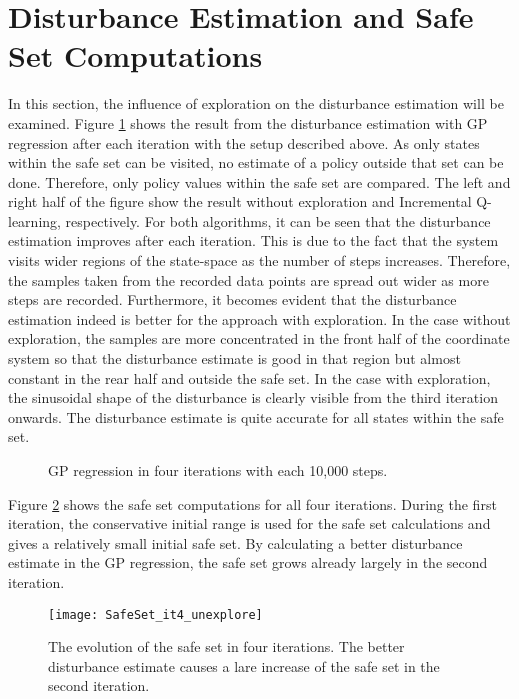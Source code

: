 \documentclass[../main.tex]{subfiles}
\begin{document}
\section{Disturbance Estimation and Safe Set Computations}
In this section, the influence of exploration on the disturbance estimation will be examined. Figure \ref{fig:GP_it4_doubleexplore} shows the result from the disturbance estimation with GP regression after each iteration with the setup described above. As only states within the safe set can be visited, no estimate of a policy outside that set can be done. Therefore, only policy values within the safe set are compared. The left and right half of the figure show the result without exploration and Incremental Q-learning, respectively. For both algorithms, it can be seen that the disturbance estimation improves after each iteration. This is due to the fact that the system visits wider regions of the state-space as the number of steps increases. Therefore, the samples taken from the recorded data points are spread out wider as more steps are recorded. Furthermore, it becomes evident that the disturbance estimation indeed is better for the approach with exploration. In the case without exploration, the samples are more concentrated in the front half of the coordinate system so that the disturbance estimate is good in that region but almost constant in the rear half and outside the safe set. In the case with exploration, the sinusoidal shape of the disturbance is clearly visible from the third iteration onwards. The disturbance estimate is quite accurate for all states within the safe set. 

\begin{figure}[H]
    \centering
        \caption{GP regression in four iterations with each 10,000 steps.}  \label{fig:GP_it4_doubleexplore}
\end{figure}


Figure \ref{fig:SafeSet_it4_unexplore} shows the safe set computations for all four iterations. During the first iteration, the conservative initial range is used for the safe set calculations and gives a relatively small initial safe set. By calculating a better disturbance estimate in the GP regression, the safe set grows already largely in the second iteration. 
\begin{figure}[H]
    \centering
    \texttt{[image: SafeSet\_it4\_unexplore]}
        \caption{The evolution of the safe set in four iterations. The better disturbance estimate causes a lare increase of the safe set in the second iteration.}  \label{fig:SafeSet_it4_unexplore}
\end{figure}
\end{document}
